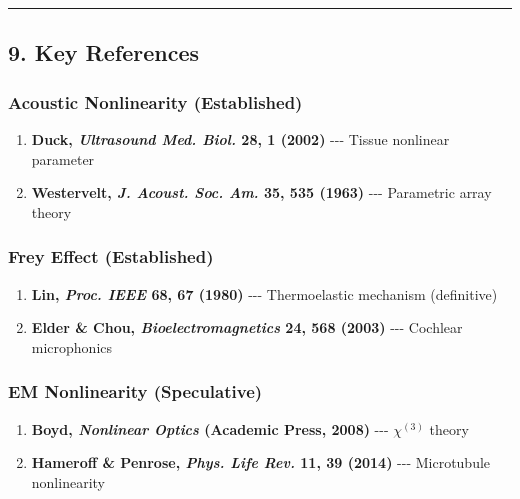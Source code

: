 \begin{center}\rule{0.5\linewidth}{0.5pt}\end{center}

\subsection{9. Key References}\label{key-references}

\subsubsection{Acoustic Nonlinearity
(Established)}\label{acoustic-nonlinearity-established}

\begin{enumerate}
\def\labelenumi{\arabic{enumi}.}
\tightlist
\item
  \textbf{Duck, \emph{Ultrasound Med. Biol.} 28, 1 (2002)} -\/-\/-
  Tissue nonlinear parameter\\
\item
  \textbf{Westervelt, \emph{J. Acoust. Soc. Am.} 35, 535 (1963)} -\/-\/-
  Parametric array theory
\end{enumerate}

\subsubsection{Frey Effect (Established)}\label{frey-effect-established}

\begin{enumerate}
\def\labelenumi{\arabic{enumi}.}
\setcounter{enumi}{2}
\tightlist
\item
  \textbf{Lin, \emph{Proc. IEEE} 68, 67 (1980)} -\/-\/- Thermoelastic
  mechanism (definitive)\\
\item
  \textbf{Elder \& Chou, \emph{Bioelectromagnetics} 24, 568 (2003)}
  -\/-\/- Cochlear microphonics
\end{enumerate}

\subsubsection{EM Nonlinearity
(Speculative)}\label{em-nonlinearity-speculative}

\begin{enumerate}
\def\labelenumi{\arabic{enumi}.}
\setcounter{enumi}{4}
\tightlist
\item
  \textbf{Boyd, \emph{Nonlinear Optics} (Academic Press, 2008)} -\/-\/-
  \(\chi^{(3)}\) theory\\
\item
  \textbf{Hameroff \& Penrose, \emph{Phys. Life Rev.} 11, 39 (2014)}
  -\/-\/- Microtubule nonlinearity
\end{enumerate}

